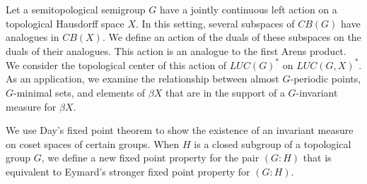 


Let a semitopological semigroup $G$ have a jointly continuous left action
on a topological Hausdorff space $X$.  In this setting, several
subspaces of $CB(G)$ have analogues in $CB(X)$.
We define an action of the duals of these subspaces on
the duals of their analogues.  This action is an analogue to
the first Arens product.
We consider the topological center of this action
of $LUC(G)^*$ on $LUC(G,X)^*$.
As an application,
we examine the relationship between almost $G$-periodic points,
$G$-minimal sets, and elements of $\beta X$ that are in the
support of a $G$-invariant measure for $\beta X$.

We use Day's fixed point theorem to show the existence of an invariant
measure on coset spaces of certain groups.
When $H$ is a closed subgroup of a topological group $G$, we define a new fixed point property 
for the pair $(G:H)$ that is
equivalent to Eymard's stronger fixed point property for $(G:H)$.

